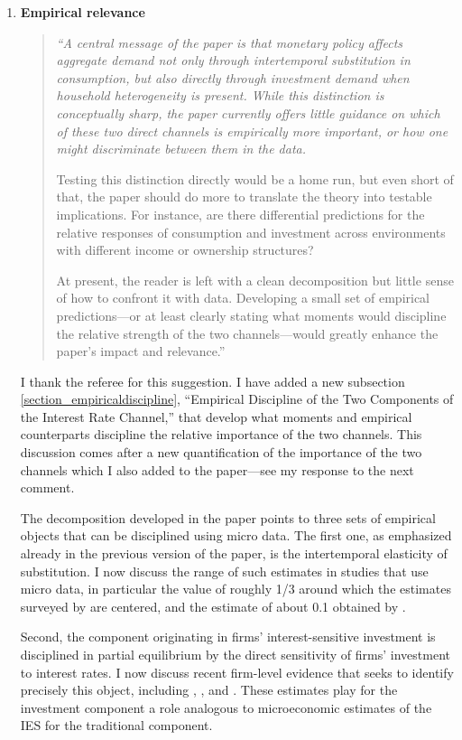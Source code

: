 \documentclass[11pt]{article}
\begin{document}
\begin{enumerate} [  1.]
\item  \textbf{Empirical relevance}

\begin{quote}
\itshape ``A central message of the paper is that monetary policy affects aggregate demand not only through intertemporal substitution in consumption, but also directly through investment demand when household heterogeneity is present. While this distinction is conceptually sharp, the paper currently offers little guidance on which of these two direct channels is empirically more important, or how one might discriminate between them in the data.

Testing this distinction directly would be a home run, but even short of that, the paper should do more to translate the theory into testable implications. For instance, are there differential predictions for the relative responses of consumption and investment across environments with different income or ownership structures?

At present, the reader is left with a clean decomposition but little sense of how to confront it with data. Developing a small set of empirical predictions---or at least clearly stating what moments would discipline the relative strength of the two channels---would greatly enhance the paper's impact and relevance.''
\end{quote}

I thank the referee for this suggestion. I have added a new subsection \ref{section_empiricaldiscipline}, “Empirical Discipline of the Two Components of the Interest Rate Channel,” that develop what moments and empirical counterparts discipline the relative importance of the two channels. This discussion comes after a new quantification of the importance of the two channels which I also added to the paper---see my response to the next comment.

The decomposition developed in the paper points to three sets of empirical objects that can be disciplined using micro data. The first one, as emphasized already in the previous version of the paper, is the intertemporal elasticity of substitution. I now discuss the range of such estimates in studies that use micro data, in particular the value of roughly 1/3 around which the estimates surveyed by \cite{Havranek2015} are centered, and the estimate of about 0.1 obtained by \cite{Bestetal2020}.

Second, the component originating in firms' interest-sensitive investment is disciplined in partial equilibrium by the direct sensitivity of firms' investment to interest rates. I now discuss recent firm-level evidence that seeks to identify precisely this object, including \cite{Caoetal2023}, \cite{BestBornMenkhoff2025}, and \cite{SharpeSuarez2021}. These estimates play for the investment component a role analogous to microeconomic estimates of the IES for the traditional component.


\end{enumerate}
\end{document}
